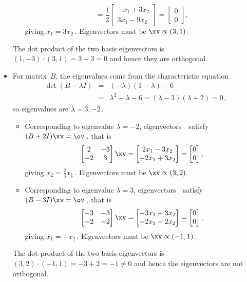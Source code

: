 \begin{example}
\begin{solution}
\begin{itemize}
\begin{itemize}
\begin{equation*}
=\frac12\begin{bmatrix} -x_1+3x_2\\3x_1-9x_2 \end{bmatrix}
=\begin{bmatrix} 0\\0 \end{bmatrix},
\end{equation*}
giving \(x_1=3x_2\)\,.  
Eigenvectors must be \(\xv\propto(3,1)\).
\end{itemize}
The dot product of the two basis eigenvectors is \((1,-3)\cdot(3,1)=3-3=0\) and hence they are orthogonal.

\item For matrix~\(B\), the eigenvalues come from the characteristic equation
\begin{eqnarray*}
\det(B-\lambda I)&=&(-\lambda)(1-\lambda)-6
\\&=&\lambda^2-\lambda-6
=(\lambda-3)(\lambda+2)=0\,,
\end{eqnarray*}
so eigenvalues are \(\lambda=3,-2\)\,.
\begin{itemize}
\item Corresponding to eigenvalue \(\lambda=-2\), eigenvectors~\xv\ satisfy \((B+2I)\xv=\ov\)\,, that is
\begin{equation*}
\begin{bmatrix} 2&-3\\-2&3 \end{bmatrix}\xv
=\begin{bmatrix} 2x_1-3x_2\\-2x_1+3x_2 \end{bmatrix}
=\begin{bmatrix} 0\\0 \end{bmatrix},
\end{equation*}
giving \(x_2=\tfrac23x_1\)\,.  
Eigenvectors must be \(\xv\propto(3,2)\).
\item Corresponding to eigenvalue \(\lambda=3\), eigenvectors~\xv\ satisfy \((B-3I)\xv=\ov\)\,, that is
\begin{equation*}
\begin{bmatrix} -3&-3\\-2&-2 \end{bmatrix}\xv
=\begin{bmatrix} -3x_1-3x_2\\-2x_1-2x_2 \end{bmatrix}
=\begin{bmatrix} 0\\0 \end{bmatrix},
\end{equation*}
giving \(x_1=-x_2\)\,.  Eigenvectors must be \(\xv\propto(-1,1)\).
\end{itemize}
The dot product of the two basis eigenvectors is \((3,2)\cdot(-1,1)=-3+2=-1\neq 0\) and hence the eigenvectors are not orthogonal.

\end{itemize}
\end{solution}
\end{example}



